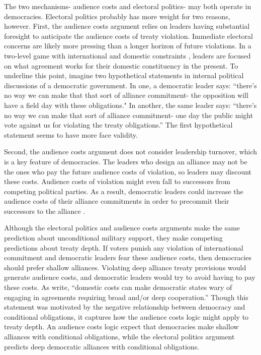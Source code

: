 \documentclass[12pt]{article}
\begin{document}
The two mechanisms- audience costs and electoral politics- may both operate in democracies. 
Electoral politics probably has more weight for two reasons, however. 
First, the audience costs argument relies on leaders having substantial foresight to anticipate the audience costs of treaty violation.  
Immediate electoral concerns are likely more pressing than a longer horizon of future violations. 
In a two-level game with international and domestic constraints \citep{Putnam1988}, leaders are focused on what agreement works for their domestic constituency in the present. 
To underline this point, imagine two hypothetical statements in internal political discussions of a democratic government. 
In one, a democratic leader says: ``there's no way we can make that that sort of alliance commitment- the opposition will have a field day with these obligations." 
In another, the same leader says: ``there's no way we can make that sort of alliance commitment- one day the public might vote against us for violating the treaty obligations.'' 
The first hypothetical statement seems to have more face validity.


Second, the audience costs argument does not consider leadership turnover, which is a key feature of democracies. 
The leaders who design an alliance may not be the ones who pay the future audience costs of violation, so leaders may discount these costs. 
Audience costs of violation might even fall to successors from competing political parties. 
As a result, democratic leaders could increase the audience costs of their alliance commitments in order to precommit their successors to the alliance \citep{Mattes2012a}. 


Although the electoral politics and audience costs arguments make the same prediction about unconditional military support, they make competing predictions about treaty depth. 
If voters punish any violation of international commitment and democratic leaders fear these audience costs, then democracies should prefer shallow alliances.
Violating deep alliance treaty provisions would generate audience costs, and democratic leaders would try to avoid having to pay these costs. 
As \citet[pg. 980]{Chibaetal2015} write, ``domestic costs can make democratic states wary of engaging in agreements requiring broad and/or deep cooperation.''  
Though this statement was motivated by the negative relationship between democracy and conditional obligations, it captures how the audience costs logic might apply to treaty depth. 
An audience costs logic expect that democracies make shallow alliances with conditional obligations, while the electoral politics argument predicts deep democratic alliances with conditional obligations. 
\end{document}
